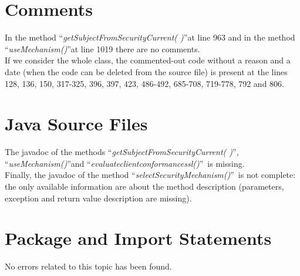 \documentclass[\mainpath/main]{subfiles}
\begin{document}
\section{Comments}
\label{CodeInspectionChecklist:Comments}
In the method \textquotedblleft \textit{getSubjectFromSecurityCurrent( )}\textquotedblright at line 963 and in the method \textquotedblleft \textit{useMechanism(\textellipsis)}\textquotedblright at line 1019 there are no comments.\\
If we consider the whole class, the commented-out code without a reason and a date (when the code can be deleted from the source file) is present at the lines 128, 136, 150, 317-325, 396, 397, 423, 486-492, 685-708, 719-778, 792 and 806.

\section{Java Source Files}
\label{CodeInspectionChecklist:JaveSourceFiles}
The javadoc of the methods \textquotedblleft \textit{getSubjectFromSecurityCurrent( )}\textquotedblright , \textquotedblleft \textit{useMechanism(\textellipsis)}\textquotedblright  and \textquotedblleft \textit{evaluate\textunderscore client\textunderscore conformance\textunderscore ssl(\textellipsis)}\textquotedblright\ is missing.\\
Finally, the javadoc of the method \textquotedblleft \textit{selectSecurityMechanism(\textellipsis)}\textquotedblright\ is not complete: the only available information are about the method description (parameters, exception and return value description are missing).

\section{Package and Import Statements}
\label{CodeInspectionChecklist:PackageandImportStatements}
No errors related to this topic has been found.
\end{document}

